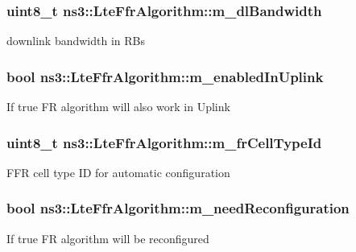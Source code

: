 \subsubsection[{\texorpdfstring{m\+\_\+dl\+Bandwidth}{m_dlBandwidth}}]{\setlength{\rightskip}{0pt plus 5cm}uint8\+\_\+t ns3\+::\+Lte\+Ffr\+Algorithm\+::m\+\_\+dl\+Bandwidth\hspace{0.3cm}{\ttfamily [protected]}}\hypertarget{classns3_1_1LteFfrAlgorithm_a97ab67b88f86f85337342478308efb0c}{}\label{classns3_1_1LteFfrAlgorithm_a97ab67b88f86f85337342478308efb0c}
downlink bandwidth in R\+Bs 
\subsubsection[{\texorpdfstring{m\+\_\+enabled\+In\+Uplink}{m_enabledInUplink}}]{\setlength{\rightskip}{0pt plus 5cm}bool ns3\+::\+Lte\+Ffr\+Algorithm\+::m\+\_\+enabled\+In\+Uplink\hspace{0.3cm}{\ttfamily [protected]}}\hypertarget{classns3_1_1LteFfrAlgorithm_a6c681821267dfedf7083600005db4bee}{}\label{classns3_1_1LteFfrAlgorithm_a6c681821267dfedf7083600005db4bee}
If true FR algorithm will also work in Uplink 
\subsubsection[{\texorpdfstring{m\+\_\+fr\+Cell\+Type\+Id}{m_frCellTypeId}}]{\setlength{\rightskip}{0pt plus 5cm}uint8\+\_\+t ns3\+::\+Lte\+Ffr\+Algorithm\+::m\+\_\+fr\+Cell\+Type\+Id\hspace{0.3cm}{\ttfamily [protected]}}\hypertarget{classns3_1_1LteFfrAlgorithm_a3d3f7443b41d708e0ac5504c7ed043b3}{}\label{classns3_1_1LteFfrAlgorithm_a3d3f7443b41d708e0ac5504c7ed043b3}
F\+FR cell type ID for automatic configuration 
\subsubsection[{\texorpdfstring{m\+\_\+need\+Reconfiguration}{m_needReconfiguration}}]{\setlength{\rightskip}{0pt plus 5cm}bool ns3\+::\+Lte\+Ffr\+Algorithm\+::m\+\_\+need\+Reconfiguration\hspace{0.3cm}{\ttfamily [protected]}}\hypertarget{classns3_1_1LteFfrAlgorithm_a2347323a45444ac4608678d92ee123f3}{}\label{classns3_1_1LteFfrAlgorithm_a2347323a45444ac4608678d92ee123f3}
If true FR algorithm will be reconfigured 
